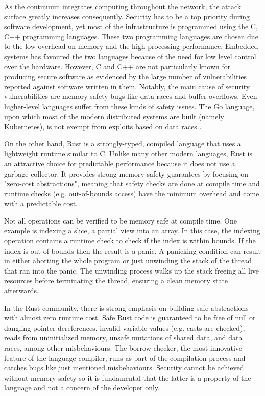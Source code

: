 As the continuum integrates computing throughout the network, the attack surface greatly increases consequently. Security has to be a top priority during software development, yet most of the infrastructure is programmed using the C, C++ programming languages. These two programming languages are chosen due to the low overhead on memory and the high processing performance. Embedded systems has favoured the two languages because of the need for low level control over the hardware.  However, C and C++ are not particularly known for producing secure software as evidenced by the large number of vulnerabilities reported against software written in them. Notably, the main cause of security vulnerabilities are memory safety bugs like data races and buffer overflows. Even higher-level languages suffer from these kinds of safety issues. The Go language, upon which most of the modern distributed systems are built (namely Kubernetes), is not exempt from exploits based on data races \cite{go-data-races}.

On the other hand, Rust is a strongly-typed, compiled language that uses a lightweight runtime similar to C. Unlike many other modern languages, Rust is an attractive choice for predictable performance because it does not use a garbage collector. It provides strong memory safety guarantees by focusing on "zero-cost abstractions", meaning that safety checks are done at compile time and runtime checks (e.g. out-of-bounds access) have the minimum overhead and come with a predictable cost.

Not all operations can be verified to be memory safe at compile time. One example is indexing a slice, a partial view into an array. In this case, the indexing operation contains a runtime check to check if the index is within bounds. If the index is out of bounds then the result is a panic. A panicking condition can result in either aborting the whole program or just unwinding the stack of the thread that ran into the panic. The unwinding process walks up the stack freeing all live resources before terminating the thread, ensuring a clean memory state afterwards.

In the Rust community, there is strong emphasis on building safe abstractions with almost zero runtime cost. Safe Rust code is guaranteed to be free of null or dangling pointer dereferences, invalid variable values (e.g. casts are checked), reads from uninitialized memory, unsafe mutations of shared data, and data races, among other misbehaviours.  The borrow checker, the most innovative feature of the language compiler, runs as part of the compilation process and catches bugs like just mentioned misbehaviours. Security cannot be achieved without memory safety so it is fundamental that the latter is a property of the language and not a concern of the developer only.


